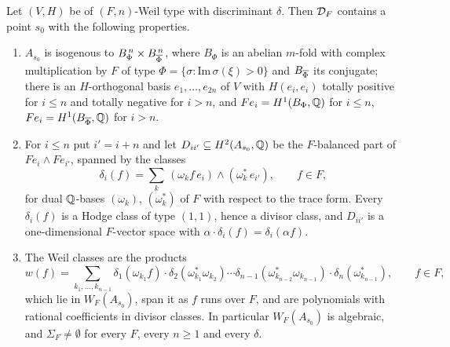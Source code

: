 \begin{theorem}
\label{thm:cmbasepoint}
Let $(V,H)$ be of $(F,n)$-Weil type with discriminant $\delta$. Then $\mathcal{D}_{F}$
contains a point $s_{0}$ with the following properties.
\begin{enumerate}[label=\textup{(\roman*)},leftmargin=2.6em,itemsep=2pt]
\item $A_{s_{0}}$ is isogenous to $B_{\Phi}^{\,n}\times B_{\overline{\Phi}}^{\,n}$,
  where $B_{\Phi}$ is an abelian $m$-fold with complex multiplication by $F$
  of type $\Phi=\{\sigma:\mathrm{Im}\,\sigma(\xi)>0\}$ and $B_{\overline{\Phi}}$ its
  conjugate; there is an $H$-orthogonal basis $e_{1},\dots,e_{2n}$ of $V$
  with $H(e_{i},e_{i})$ totally positive for $i\le n$ and totally negative
  for $i>n$, and $Fe_{i}=H^{1}(B_{\Phi},\mathbb{Q})$ for $i\le n$,
  $Fe_{i}=H^{1}(B_{\overline{\Phi}},\mathbb{Q})$ for $i>n$.
\item For $i\le n$ put $i'=i+n$ and let $D_{ii'}\subseteq H^{2}(A_{s_{0}},\mathbb{Q})$
  be the $F$-balanced part of $Fe_{i}\wedge Fe_{i'}$, spanned by the classes
  \[
    \delta_{i}(f)=\sum_{k}\,(\omega_{k}f\,e_{i})\wedge(\omega_{k}^{*}\,e_{i'}),
    \qquad f\in F,
  \]
  for dual $\mathbb{Q}$-bases $(\omega_{k})$, $(\omega_{k}^{*})$ of $F$ with respect
  to the trace form. Every $\delta_{i}(f)$ is a Hodge class of type $(1,1)$,
  hence a divisor class, and $D_{ii'}$ is a one-dimensional $F$-vector space
  with $\alpha\cdot\delta_{i}(f)=\delta_{i}(\alpha f)$.
\item The Weil classes are the products
  \[
    w(f)=\sum_{k_{1},\dots,k_{n-1}}
      \delta_{1}(\omega_{k_{1}}f)\cdot\delta_{2}(\omega_{k_{1}}^{*}\omega_{k_{2}})
      \cdots\delta_{n-1}(\omega_{k_{n-2}}^{*}\omega_{k_{n-1}})\cdot
      \delta_{n}(\omega_{k_{n-1}}^{*}),\qquad f\in F,
  \]
  which lie in $W_{F}(A_{s_{0}})$, span it as $f$ runs over $F$, and are
  polynomials with rational coefficients in divisor classes. In particular
  $W_{F}(A_{s_{0}})$ is algebraic, and $\Sigma_{F}\ne\emptyset$ for every $F$,
  every $n\ge1$ and every $\delta$.
\end{enumerate}
\end{theorem}

